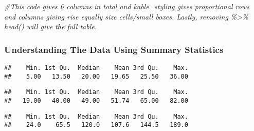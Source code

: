 \documentclass[
]{article}
\newenvironment{Shaded}{\begin{snugshade}}{\end{snugshade}}
\newcommand{\CommentTok}[1]{\textcolor[rgb]{0.56,0.35,0.01}{\textit{#1}}}
\newcommand{\FunctionTok}[1]{\textcolor[rgb]{0.00,0.00,0.00}{#1}}
\newcommand{\NormalTok}[1]{#1}
\newcommand{\SpecialCharTok}[1]{\textcolor[rgb]{0.00,0.00,0.00}{#1}}
\begin{document}
\begin{Shaded}
\begin{Highlighting}[]
\CommentTok{\#This code gives 6 columns in total and kable\_styling gives proportional rows and columns giving rise equally size cells/small boxes. Lastly, removing  \%\textgreater{}\% head() will give the full table.}
\end{Highlighting}
\end{Shaded}

\hypertarget{understanding-the-data-using-summary-statistics}{%
\subsubsection{Understanding The Data Using Summary
Statistics}\label{understanding-the-data-using-summary-statistics}}

\begin{Shaded}
\end{Shaded}

\begin{verbatim}
##    Min. 1st Qu.  Median    Mean 3rd Qu.    Max. 
##    5.00   13.50   20.00   19.65   25.50   36.00
\end{verbatim}

\begin{Shaded}
\end{Shaded}

\begin{verbatim}
##    Min. 1st Qu.  Median    Mean 3rd Qu.    Max. 
##   19.00   40.00   49.00   51.74   65.00   82.00
\end{verbatim}

\begin{Shaded}
\end{Shaded}

\begin{verbatim}
##    Min. 1st Qu.  Median    Mean 3rd Qu.    Max. 
##    24.0    65.5   120.0   107.6   144.5   189.0
\end{verbatim}
\end{document}
